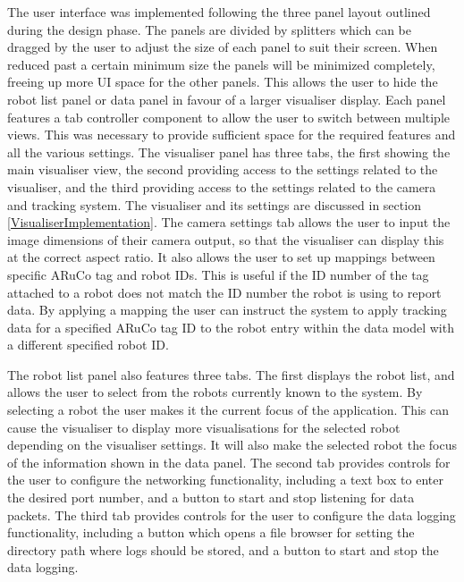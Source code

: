 The user interface was implemented following the three panel layout outlined during the design phase. The panels are divided by splitters which can be dragged by the user to adjust the size of each panel to suit their screen. When reduced past a certain minimum size the panels will be minimized completely, freeing up more UI space for the other panels. This allows the user to hide the robot list panel or data panel in favour of a larger visualiser display. Each panel features a tab controller component to allow the user to switch between multiple views. This was necessary to provide sufficient space for the required features and all the various settings. The visualiser panel has three tabs, the first showing the main visualiser view, the second providing access to the settings related to the visualiser, and the third providing access to the settings related to the camera and tracking system. The visualiser and its settings are discussed in section \ref{VisualiserImplementation}. The camera settings tab allows the user to input the image dimensions of their camera output, so that the visualiser can display this at the correct aspect ratio. It also allows the user to set up mappings between specific ARuCo tag and robot IDs. This is useful if the ID number of the tag attached to a robot does not match the ID number the robot is using to report data. By applying a mapping the user can instruct the system to apply tracking data for a specified ARuCo tag ID to the robot entry within the data model with a different specified robot ID.

The robot list panel also features three tabs. The first displays the robot list, and allows the user to select from the robots currently known to the system. By selecting a robot the user makes it the current focus of the application. This can cause the visualiser to display more visualisations for the selected robot depending on the visualiser settings. It will also make the selected robot the focus of the information shown in the data panel. The second tab provides controls for the user to configure the networking functionality, including a text box to enter the desired port number, and a button to start and stop listening for data packets. The third tab provides controls for the user to configure the data logging functionality, including a button which opens a file browser for setting the directory path where logs should be stored, and a button to start and stop the data logging.

